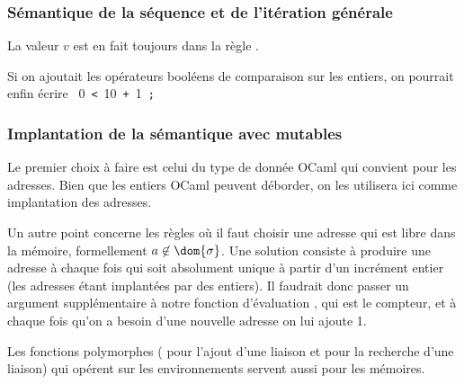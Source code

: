 %
\begin{frame}
\frametitle{Sémantique de la séquence et de l'itération générale}

{\small
{}
}
\remarque \quad La valeur $v$ est en fait toujours \lpar\rpar{} dans
la règle .

\bigskip

Si on ajoutait les opérateurs booléens de comparaison sur les entiers,
on pourrait enfin écrire \mbox{\small \Xlet {} \equal \num{0} \Xin
\lpar\Xwhile {} \texttt{<} \num{10} \Xdo {} \assign {}
\texttt{+} \num{1} \Xdone\!\!\!\texttt{;}\rpar}

\end{frame}

%
\begin{frame}
\frametitle{Implantation de la sémantique avec mutables}

Le premier choix à faire est celui du type de donnée OCaml qui
convient pour les adresses. Bien que les entiers OCaml peuvent
déborder, on les utilisera ici comme implantation des adresses.

Un autre point concerne les règles où il faut choisir une adresse qui
est libre dans la mémoire, formellement $a \not\in \dom{\sigma}$. Une
solution consiste à produire une adresse à chaque fois qui soit
absolument unique à partir d'un incrément entier (les adresses étant
implantées par des entiers). Il faudrait donc passer un argument
supplémentaire à notre fonction d'évaluation , qui est le
compteur, et à chaque fois qu'on a besoin d'une nouvelle adresse on
lui ajoute 1.

Les fonctions polymorphes ( pour l'ajout d'une liaison et
 pour la recherche d'une liaison) qui opérent sur les
environnements servent aussi pour les mémoires.

\end{frame}
